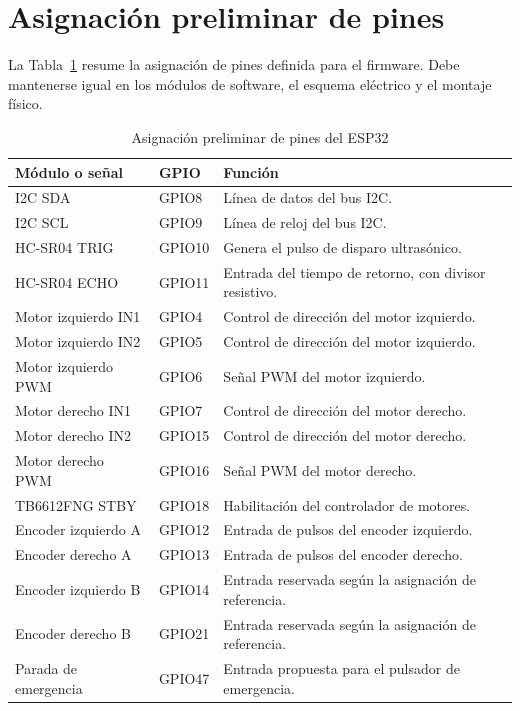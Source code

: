 \documentclass[journal]{IEEEtran}
\begin{document}
\section{Asignación preliminar de pines}

La Tabla~\ref{tab:pinout} resume la asignación de pines definida para el firmware. Debe mantenerse igual en los módulos de software, el esquema eléctrico y el montaje físico.

\begin{table}[t]
\centering
\caption{Asignación preliminar de pines del ESP32}
\label{tab:pinout}
\scriptsize
\begin{tabular}{p{} p{} p{}}
\toprule
\textbf{Módulo o señal} & \textbf{GPIO} & \textbf{Función} \\
\midrule
I2C SDA & GPIO8 & Línea de datos del bus I2C. \\
I2C SCL & GPIO9 & Línea de reloj del bus I2C. \\
HC-SR04 TRIG & GPIO10 & Genera el pulso de disparo ultrasónico. \\
HC-SR04 ECHO & GPIO11 & Entrada del tiempo de retorno, con divisor resistivo. \\
Motor izquierdo IN1 & GPIO4 & Control de dirección del motor izquierdo. \\
Motor izquierdo IN2 & GPIO5 & Control de dirección del motor izquierdo. \\
Motor izquierdo PWM & GPIO6 & Señal PWM del motor izquierdo. \\
Motor derecho IN1 & GPIO7 & Control de dirección del motor derecho. \\
Motor derecho IN2 & GPIO15 & Control de dirección del motor derecho. \\
Motor derecho PWM & GPIO16 & Señal PWM del motor derecho. \\
TB6612FNG STBY & GPIO18 & Habilitación del controlador de motores. \\
Encoder izquierdo A & GPIO12 & Entrada de pulsos del encoder izquierdo. \\
Encoder derecho A & GPIO13 & Entrada de pulsos del encoder derecho. \\
Encoder izquierdo B & GPIO14 & Entrada reservada según la asignación de referencia. \\
Encoder derecho B & GPIO21 & Entrada reservada según la asignación de referencia. \\
Parada de emergencia & GPIO47 & Entrada propuesta para el pulsador de emergencia. \\
\bottomrule
\end{tabular}
\end{table}
\end{document}
